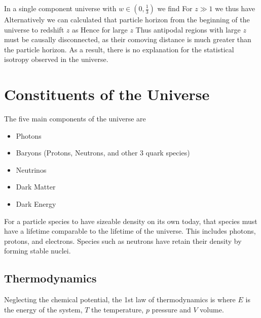 \documentclass{article}
\begin{document}
\begin{example}\label{example:CSM:horizon problem}
In a single component universe with $w\in(0,\frac{1}{3})$ we find 
For $z\gg1$ we thus have 
Alternatively we can calculated that particle horizon from the beginning of the universe to redshift $z$ as 
Hence for large $z$
Thus antipodal regions with large $z$ must be causally disconnected, as their comoving distance is much greater than the particle horizon. As a result, there is no explanation for the statistical isotropy observed in the universe. 
\end{example}
\section{Constituents of the Universe}
The five main components of the universe are 
\begin{itemize}
    \item Photons
    \item Baryons (Protons, Neutrons, and other 3 quark species)
    \item Neutrinos
    \item Dark Matter 
    \item Dark Energy
\end{itemize}
For a particle species to have sizeable density on its own today, that species must have a lifetime comparable to the lifetime of the universe. This includes photons, protons, and electrons. Species such as neutrons have retain their density by forming stable nuclei. 

\subsection{Thermodynamics}
\begin{definition}
Neglecting the chemical potential, the 1st law of thermodynamics is 
where $E$ is the energy of the system, $T$ the temperature, $p$ pressure and $V$ volume. 
\end{definition}
\end{document}
